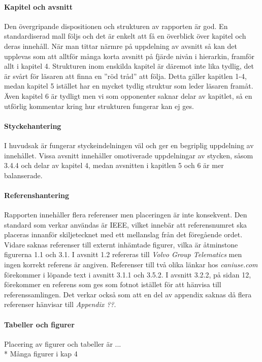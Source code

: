     \paragraph{Kapitel och avsnitt}
        Den övergripande dispositionen och strukturen av rapporten är god. En standardiserad mall följs och det är enkelt att få en överblick över kapitel och deras innehåll. När man tittar närmre på uppdelning av avsnitt så kan det upplevas som att alltför många korta avsnitt på fjärde nivån i hierarkin, framför allt i kapitel 4. Strukturen inom enskilda kapitel är däremot inte lika tydlig, det är svårt för läsaren att finna en ''röd tråd'' att följa. Detta gäller kapitlen 1-4, medan kapitel 5 istället har en mycket tydlig struktur som leder läsaren framåt. Även kapitel 6 är tydligt men vi som opponenter saknar delar av kapitlet, så en utförlig kommentar kring hur strukturen fungerar kan ej ges.
     
    \paragraph{Styckehantering}
        I huvudsak är fungerar styckeindelningen väl och ger en begriplig uppdelning av innehållet. Vissa avsnitt innehåller omotiverade uppdelningar av stycken, såsom 3.4.4 och delar av kapitel 4, medan avsnitten i kapitlen 5 och 6 är mer balanserade.

    \paragraph{Referenshantering}
        Rapporten innehåller flera referenser men placeringen är inte konsekvent. Den standard som verkar användas är IEEE, vilket innebär att referensnumret ska placeras innanför skiljetecknet med ett mellanslag från det föregående ordet. Vidare saknas referenser till externt inhämtade figurer, vilka är åtminstone figurerna 1.1 och 3.1. I avsnitt 1.2 refereras till \emph{Volvo Group Telematics} men ingen korrekt referens är angiven. Referenser till två olika länkar hos \emph{caniuse.com} förekommer i löpande text i avsnitt 3.1.1 och 3.5.2. I avsnitt 3.2.2, på sidan 12, förekommer en referens som ges som fotnot istället för att hänvisa till referenssamlingen. Det verkar också som att en del av appendix saknas då flera referenser hänvisar till \emph{Appendix ??}.
    
    \paragraph{Tabeller och figurer}
        Placering av figurer och tabeller är ...
        \\ * Många figurer i kap 4
    


